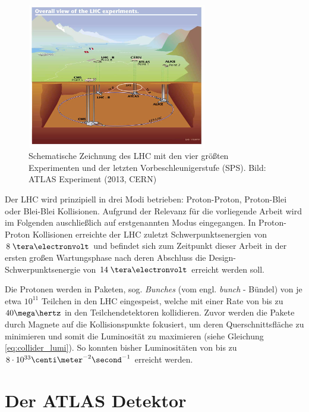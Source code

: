 \begin{figure}[h]
    \centering
    \includegraphics[width=0.7\textwidth]{img/lhc}
    \caption[Zeichnung des LHC mit Vorbeschleunigern und Experimenten]
        {Schematische Zeichnung des LHC mit den vier größten Experimenten und
        der letzten Vorbeschleunigerstufe (SPS). Bild: ATLAS Experiment
        (2013, CERN)}
    \label{fig:LHC}
\end{figure}

Der \ac{LHC} wird prinzipiell in drei Modi betrieben: Proton-Proton,
Proton-Blei oder Blei-Blei Kollisionen. Aufgrund der Relevanz für die
vorliegende Arbeit wird im Folgenden auschließlich auf erstgenannten Modus
eingegangen. In Proton-Proton Kollisionen erreichte der \ac{LHC} zuletzt
Schwerpunktsenergien von $8\TeV$ und befindet sich zum Zeitpunkt dieser Arbeit
in der ersten großen Wartungsphase nach deren Abschluss die
Design-Schwerpunktsenergie von $14\TeV$ erreicht werden soll.

Die Protonen werden in Paketen, sog. \textit{Bunches} (vom engl. \textit{bunch}
- Bündel) von je etwa $10^{11}$ Teilchen in den \ac{LHC} eingespeist, welche
mit einer Rate von bis zu $40\mega\hertz$ in den Teilchendetektoren
kollidieren. Zuvor werden die Pakete durch Magnete auf die Kollisionspunkte
fokusiert, um deren Querschnittsfläche zu minimieren und somit die Luminosität
zu maximieren (siehe Gleichung \ref{eq:collider_lumi}). So konnten bisher
Luminositäten von bis zu $8\cdot 10^{33} \centi\meter^{-2}\second^{-1}$
erreicht werden.



%
\section{Der ATLAS Detektor}
\label{atlas_detector}

